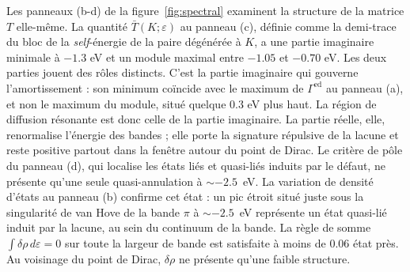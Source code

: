 \newpage
{}

Les panneaux (b-d) de la figure~\ref{fig:spectral} examinent la structure de la matrice $T$ elle-même. La quantité $\bar T(K;\varepsilon)$ au panneau (c), définie comme la demi-trace du bloc de la \textit{self}-énergie de la paire dégénérée à $K$, a une partie imaginaire minimale à $-1.3$ eV et un module maximal entre $-1.05$ et $-0.70$ eV. Les deux parties jouent des rôles distincts. C'est la partie imaginaire qui gouverne l'amortissement : son minimum coïncide avec le maximum de $\Gamma^\text{ed}$ au panneau (a), et non le maximum du module, situé quelque $0.3$ eV plus haut. La région de diffusion résonante est donc celle de la partie imaginaire. La partie réelle, elle, renormalise l'énergie des bandes ; elle porte la signature répulsive de la lacune et reste positive partout dans la fenêtre autour du point de Dirac. Le critère de pôle du panneau (d), qui localise les états liés et quasi-liés induits par le défaut, ne présente qu'une seule quasi-annulation à $\sim-2.5$~eV. La variation de densité d'états au panneau (b) confirme cet état : un pic étroit situé juste sous la singularité de van Hove de la bande $\pi$ à $\sim-2.5$~eV représente un état quasi-lié induit par la lacune, au sein du continuum de la bande. La règle de somme $\int\delta\rho\,d\varepsilon = 0$ sur toute la largeur de bande est satisfaite à moins de 0.06 état près. Au voisinage du point de Dirac, $\delta\rho$ ne présente qu'une faible structure.


